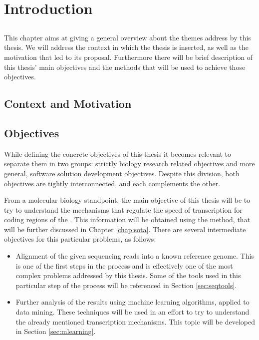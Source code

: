 \chapter{Introduction} \label{chap:intro}

\section*{}

This chapter aims at giving a general overview about the themes address by this
thesis. We will address the context in which the thesis is inserted, as well as
the motivation that led to its proposal. Furthermore there will be brief
description of this thesis' main objectives and the methods that will be used to
achieve those objectives.

\section{Context and Motivation} \label{sec:context}

\section{Objectives} \label{sec:goals}

While defining the concrete objectives of this thesis it becomes relevant to
separate them in two groups: strictly biology research related objectives and
more general, software solution development objectives. Despite this division,
both objectives are tightly interconnected, and each complements the other.

From a molecular biology standpoint, the main objective of this thesis will be
to try to understand the mechanisms that regulate the speed of transcription for
coding regions of the \dna. This information will be obtained using the
\rnaseq{} method, that will be further discussed in Chapter \ref{chap:sota}.
There are several intermediate objectives for this particular problems, as
follows:

\begin{itemize}

  \item
  Alignment of the given sequencing reads into a known reference genome. This is
  one of the first steps in the \rnaseq{} process and is effectively one of the
  most complex problems addressed by this thesis. Some of the tools used in this
  particular step of the process will be referenced in Section \ref{sec:seqtools}.

  \item
  Further analysis of the \rnaseq{} results using machine learning algorithms,
  applied to data mining. These techniques will be used in an effort to try to
  understand the already mentioned transcription mechanisms. This topic will be
  developed in Section \ref{sec:mlearning}.

\end{itemize}

